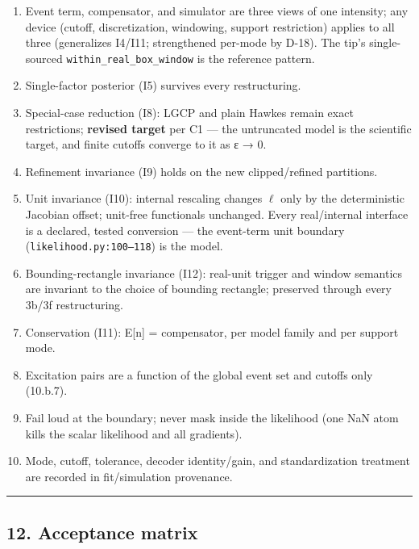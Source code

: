 \documentclass[
  10pt,
]{article}
\providecommand{\tightlist}{%
  \setlength{\itemsep}{0pt}\setlength{\parskip}{0pt}}
\begin{document}
\begin{enumerate}
\def\labelenumi{\arabic{enumi}.}
\tightlist
\item
  Event term, compensator, and simulator are three views of one intensity; any device (cutoff, discretization, windowing, support restriction) applies to all three (generalizes I4/I11; strengthened per-mode by D-18). The tip's single-sourced \texttt{within\_\allowbreak{}real\_\allowbreak{}box\_\allowbreak{}window} is the reference pattern.
\item
  Single-factor posterior (I5) survives every restructuring.
\item
  Special-case reduction (I8): LGCP and plain Hawkes remain exact restrictions; \textbf{revised target} per C1 --- the untruncated model is the scientific target, and finite cutoffs converge to it as ε → 0.
\item
  Refinement invariance (I9) holds on the new clipped/refined partitions.
\item
  Unit invariance (I10): internal rescaling changes \(\ell\) only by the deterministic Jacobian offset; unit-free functionals unchanged. Every real/internal interface is a declared, tested conversion --- the event-term unit boundary (\texttt{likelihood.py:100–118}) is the model.
\item
  Bounding-rectangle invariance (I12): real-unit trigger and window semantics are invariant to the choice of bounding rectangle; preserved through every 3b/3f restructuring.
\item
  Conservation (I11): E{[}n{]} = compensator, per model family and per support mode.
\item
  Excitation pairs are a function of the global event set and cutoffs only (10.b.7).
\item
  Fail loud at the boundary; never mask inside the likelihood (one NaN atom kills the scalar likelihood and all gradients).
\item
  Mode, cutoff, tolerance, decoder identity/gain, and standardization treatment are recorded in fit/simulation provenance.
\end{enumerate}

\begin{center}\rule{0.5\linewidth}{0.5pt}\end{center}

\hypertarget{acceptance-matrix}{%
\subsection{12. Acceptance matrix}\label{acceptance-matrix}}
\end{document}
